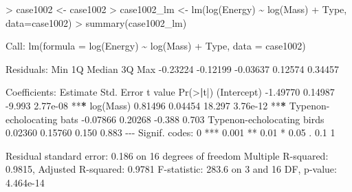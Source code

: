 \documentclass[
]{article}
\newenvironment{Shaded}{\begin{snugshade}}{\end{snugshade}}
\newcommand{\AttributeTok}[1]{\textcolor[rgb]{0.77,0.63,0.00}{#1}}
\newcommand{\DecValTok}[1]{\textcolor[rgb]{0.00,0.00,0.81}{#1}}
\newcommand{\ErrorTok}[1]{\textcolor[rgb]{0.64,0.00,0.00}{\textbf{#1}}}
\newcommand{\FloatTok}[1]{\textcolor[rgb]{0.00,0.00,0.81}{#1}}
\newcommand{\FunctionTok}[1]{\textcolor[rgb]{0.00,0.00,0.00}{#1}}
\newcommand{\NormalTok}[1]{#1}
\newcommand{\OtherTok}[1]{\textcolor[rgb]{0.56,0.35,0.01}{#1}}
\newcommand{\SpecialCharTok}[1]{\textcolor[rgb]{0.00,0.00,0.00}{#1}}
\newcommand{\StringTok}[1]{\textcolor[rgb]{0.31,0.60,0.02}{#1}}
\begin{document}
\begin{Shaded}
\begin{Highlighting}[]
\SpecialCharTok{\textgreater{}}\NormalTok{ case1002 }\OtherTok{\textless{}{-}}\NormalTok{ case1002}
\SpecialCharTok{\textgreater{}}\NormalTok{ case1002\_lm }\OtherTok{\textless{}{-}} \FunctionTok{lm}\NormalTok{(}\FunctionTok{log}\NormalTok{(Energy) }\SpecialCharTok{\textasciitilde{}} \FunctionTok{log}\NormalTok{(Mass) }\SpecialCharTok{+}\NormalTok{ Type, }\AttributeTok{data=}\NormalTok{case1002)}
\SpecialCharTok{\textgreater{}} \FunctionTok{summary}\NormalTok{(case1002\_lm)}

\NormalTok{Call}\SpecialCharTok{:}
\FunctionTok{lm}\NormalTok{(}\AttributeTok{formula =} \FunctionTok{log}\NormalTok{(Energy) }\SpecialCharTok{\textasciitilde{}} \FunctionTok{log}\NormalTok{(Mass) }\SpecialCharTok{+}\NormalTok{ Type, }\AttributeTok{data =}\NormalTok{ case1002)}

\NormalTok{Residuals}\SpecialCharTok{:}
\NormalTok{     Min       1Q   Median       3Q      Max }
\SpecialCharTok{{-}}\FloatTok{0.23224} \SpecialCharTok{{-}}\FloatTok{0.12199} \SpecialCharTok{{-}}\FloatTok{0.03637}  \FloatTok{0.12574}  \FloatTok{0.34457} 

\NormalTok{Coefficients}\SpecialCharTok{:}
\NormalTok{                           Estimate Std. Error t value }\FunctionTok{Pr}\NormalTok{(}\SpecialCharTok{\textgreater{}}\ErrorTok{|}\NormalTok{t}\SpecialCharTok{|}\NormalTok{)    }
\NormalTok{(Intercept)                }\SpecialCharTok{{-}}\FloatTok{1.49770}    \FloatTok{0.14987}  \SpecialCharTok{{-}}\FloatTok{9.993} \FloatTok{2.77e{-}08} \SpecialCharTok{**}\ErrorTok{*}
\FunctionTok{log}\NormalTok{(Mass)                   }\FloatTok{0.81496}    \FloatTok{0.04454}  \FloatTok{18.297} \FloatTok{3.76e{-}12} \SpecialCharTok{**}\ErrorTok{*}
\NormalTok{Typenon}\SpecialCharTok{{-}}\NormalTok{echolocating bats  }\SpecialCharTok{{-}}\FloatTok{0.07866}    \FloatTok{0.20268}  \SpecialCharTok{{-}}\FloatTok{0.388}    \FloatTok{0.703}    
\NormalTok{Typenon}\SpecialCharTok{{-}}\NormalTok{echolocating birds  }\FloatTok{0.02360}    \FloatTok{0.15760}   \FloatTok{0.150}    \FloatTok{0.883}    
\SpecialCharTok{{-}{-}{-}}
\NormalTok{Signif. codes}\SpecialCharTok{:}  \DecValTok{0} \StringTok{\textquotesingle{}***\textquotesingle{}} \FloatTok{0.001} \StringTok{\textquotesingle{}**\textquotesingle{}} \FloatTok{0.01} \StringTok{\textquotesingle{}*\textquotesingle{}} \FloatTok{0.05} \StringTok{\textquotesingle{}.\textquotesingle{}} \FloatTok{0.1} \StringTok{\textquotesingle{} \textquotesingle{}} \DecValTok{1}

\NormalTok{Residual standard error}\SpecialCharTok{:} \FloatTok{0.186}\NormalTok{ on }\DecValTok{16}\NormalTok{ degrees of freedom}
\NormalTok{Multiple R}\SpecialCharTok{{-}}\NormalTok{squared}\SpecialCharTok{:}  \FloatTok{0.9815}\NormalTok{,    Adjusted R}\SpecialCharTok{{-}}\NormalTok{squared}\SpecialCharTok{:}  \FloatTok{0.9781} 
\NormalTok{F}\SpecialCharTok{{-}}\NormalTok{statistic}\SpecialCharTok{:} \FloatTok{283.6}\NormalTok{ on }\DecValTok{3}\NormalTok{ and }\DecValTok{16}\NormalTok{ DF,  p}\SpecialCharTok{{-}}\NormalTok{value}\SpecialCharTok{:} \FloatTok{4.464e{-}14}
\end{Highlighting}
\end{Shaded}
\end{document}
